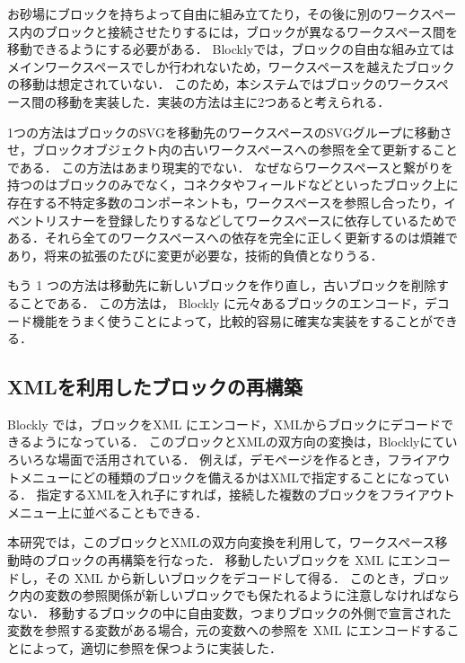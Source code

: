 お砂場にブロックを持ちよって自由に組み立てたり，その後に別のワークスペース内のブロックと接続させたりするには，ブロックが異なるワークスペース間を移動できるようにする必要がある．
Blocklyでは，ブロックの自由な組み立てはメインワークスペースでしか行われないため，ワークスペースを越えたブロックの移動は想定されていない．
このため，本システムではブロックのワークスペース間の移動を実装した．実装の方法は主に2つあると考えられる．

1つの方法はブロックのSVGを移動先のワークスペースのSVGグループに移動させ，ブロックオブジェクト内の古いワークスペースへの参照を全て更新することである．%
この方法はあまり現実的でない．
なぜならワークスペースと繋がりを持つのはブロックのみでなく，コネクタやフィールドなどといったブロック上に存在する不特定多数のコンポーネントも，ワークスペースを参照し合ったり，イベントリスナーを登録したりするなどしてワークスペースに依存しているためである．それら全てのワークスペースへの依存を完全に正しく更新するのは煩雑であり，将来の拡張のたびに変更が必要な，技術的負債となりうる．

もう 1 つの方法は移動先に新しいブロックを作り直し，古いブロックを削除することである．
この方法は， Blockly に元々あるブロックのエンコード，デコード機能をうまく使うことによって，比較的容易に確実な実装をすることができる．

\subsection*{XMLを利用したブロックの再構築}

Blockly では，ブロックをXML にエンコード，XMLからブロックにデコードできるようになっている．
このブロックとXMLの双方向の変換は，Blocklyにていろいろな場面で活用されている．
例えば，デモページを作るとき，フライアウトメニューにどの種類のブロックを備えるかはXMLで指定することになっている．
指定するXMLを入れ子にすれば，接続した複数のブロックをフライアウトメニュー上に並べることもできる．

本研究では，このブロックとXMLの双方向変換を利用して，ワークスペース移動時のブロックの再構築を行なった．
移動したいブロックを XML にエンコードし，その XML から新しいブロックをデコードして得る．
このとき，ブロック内の変数の参照関係が新しいブロックでも保たれるように注意しなければならない．
移動するブロックの中に自由変数，つまりブロックの外側で宣言された変数を参照する変数がある場合，元の変数への参照を XML にエンコードすることによって，適切に参照を保つように実装した．

